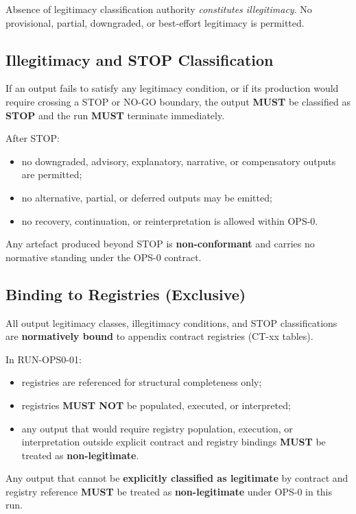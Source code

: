 Absence of legitimacy classification authority
\emph{constitutes illegitimacy}.
No provisional, partial, downgraded,
or best-effort legitimacy is permitted.

\subsection{Illegitimacy and STOP Classification}
If an output fails to satisfy any legitimacy condition,
or if its production would require crossing
a STOP or NO-GO boundary,
the output \textbf{MUST} be classified as \textbf{STOP}
and the run \textbf{MUST} terminate immediately.

After STOP:
\begin{itemize}
  \item no downgraded, advisory, explanatory,
        narrative, or compensatory outputs are permitted;
  \item no alternative, partial, or deferred outputs may be emitted;
  \item no recovery, continuation, or reinterpretation
        is allowed within OPS-0.
\end{itemize}

Any artefact produced beyond STOP
is \textbf{non-conformant} and
carries no normative standing
under the OPS-0 contract.

\subsection{Binding to Registries (Exclusive)}
All output legitimacy classes,
illegitimacy conditions,
and STOP classifications
are \textbf{normatively bound}
to appendix contract registries (CT-xx tables).

In RUN-OPS0-01:
\begin{itemize}
  \item registries are referenced for structural completeness only;
  \item registries \textbf{MUST NOT} be populated,
        executed, or interpreted;
  \item any output that would require registry population, execution,
        or interpretation outside explicit contract
        and registry bindings \textbf{MUST} be treated as \textbf{non-legitimate}.
\end{itemize}

Any output that cannot be
\textbf{explicitly classified as legitimate}
by contract and registry reference
\textbf{MUST} be treated as \textbf{non-legitimate}
under OPS-0 in this run.
